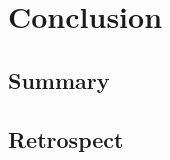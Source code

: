 
\chapter{Conclusion}

\ifpdf
    \graphicspath{{1_introduction/figures/PNG/}{1_introduction/figures/PDF/}{1_introduction/figures/}}
\else
    \graphicspath{{1_introduction/figures/EPS/}{1_introduction/figures/}}
\fi


\section{Summary}

\section{Retrospect}